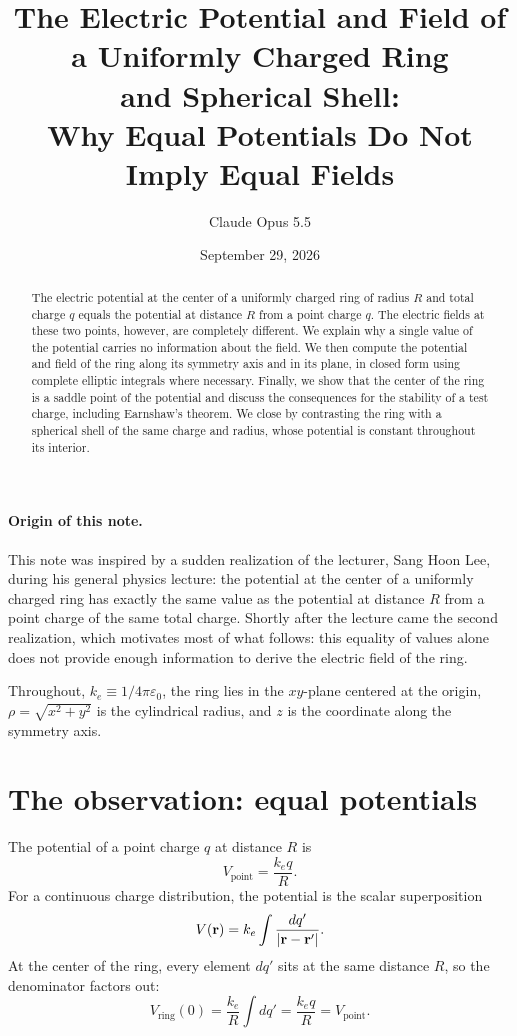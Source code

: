 \documentclass[11pt,a4paper]{article}
\title{The Electric Potential and Field of a Uniformly Charged Ring\\ and Spherical Shell:\\
\large Why Equal Potentials Do Not Imply Equal Fields}
\author{Claude Opus 5.5}
\date{September 29, 2026}
\newcommand{\ke}{k_e}
\begin{document}
\maketitle

\begin{abstract}
The electric potential at the center of a uniformly charged ring of radius $R$ and total charge $q$ equals the potential at distance $R$ from a point charge $q$. The electric fields at these two points, however, are completely different. We explain why a single value of the potential carries no information about the field. We then compute the potential and field of the ring along its symmetry axis and in its plane, in closed form using complete elliptic integrals where necessary. Finally, we show that the center of the ring is a saddle point of the potential and discuss the consequences for the stability of a test charge, including Earnshaw's theorem. We close by contrasting the ring with a spherical shell of the same charge and radius, whose potential is constant throughout its interior.
\end{abstract}

\paragraph{Origin of this note.} This note was inspired by a sudden realization of the lecturer, Sang Hoon Lee, during his general physics lecture: the potential at the center of a uniformly charged ring has exactly the same value as the potential at distance $R$ from a point charge of the same total charge. Shortly after the lecture came the second realization, which motivates most of what follows: this equality of values alone does not provide enough information to derive the electric field of the ring.

\medskip
Throughout, $\ke \equiv 1/4\pi\varepsilon_0$, the ring lies in the $xy$-plane centered at the origin, $\rho=\sqrt{x^2+y^2}$ is the cylindrical radius, and $z$ is the coordinate along the symmetry axis.

\section{The observation: equal potentials}

The potential of a point charge $q$ at distance $R$ is
\begin{equation}
V_{\text{point}} = \frac{\ke q}{R}.
\end{equation}
For a continuous charge distribution, the potential is the scalar superposition
\begin{equation}
V(\vb r) = \ke \int \frac{dq'}{\abs{\vb r - \vb r'}}.
\label{eq:superposition}
\end{equation}
At the center of the ring, every element $dq'$ sits at the same distance $R$, so the denominator factors out:
\begin{equation}
V_{\text{ring}}(0) = \frac{\ke}{R}\int dq' = \frac{\ke q}{R} = V_{\text{point}}.
\end{equation}
\end{document}
